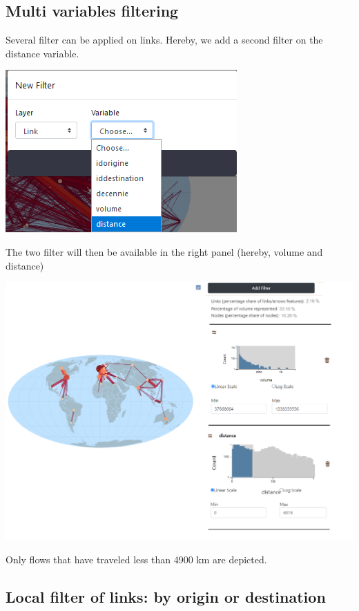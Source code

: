 \documentclass[
  letterpaper,
  DIV=11,
  numbers=noendperiod]{scrreprt}
\begin{document}
\subsection{Multi variables filtering}\label{multi-variables-filtering}

Several filter can be applied on links. Hereby, we add a second filter
on the distance variable.

\includegraphics{images/Add_filter_links_dist.png}

The two filter will then be available in the right panel (hereby, volume
and distance)

\includegraphics{images/Add_links_filter_vol_distance.png}

Only flows that have traveled less than 4900 km are depicted.

\subsection{Local filter of links: by origin or
destination}\label{local-filter-of-links-by-origin-or-destination}
\end{document}
